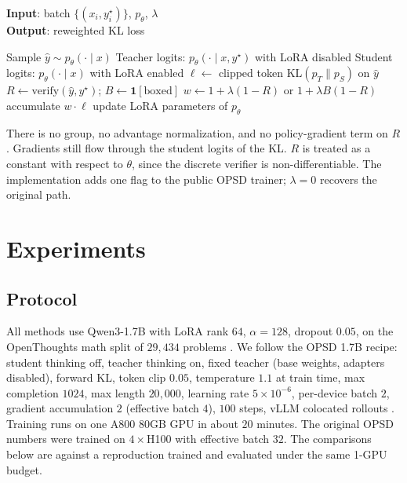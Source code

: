 \documentclass[letterpaper]{article}
\begin{document}
\begin{algorithm}[tb]
\caption{BER-OPSD training step}
\label{alg:og}
\textbf{Input}: batch $\{(x_i,y_i^\star)\}$, $p_\theta$, $\lambda$\\
\textbf{Output}: reweighted KL loss
\begin{algorithmic}[1]
\STATE Sample $\hat y\sim p_\theta(\cdot\mid x)$ 
\STATE Teacher logits: $p_\theta(\cdot\mid x,y^\star)$ with LoRA disabled
\STATE Student logits: $p_\theta(\cdot\mid x)$ with LoRA enabled
\STATE $\ell \leftarrow$ clipped token $\mathrm{KL}(p_T\|p_S)$ on $\hat y$
\STATE $R\leftarrow\mathrm{verify}(\hat y,y^\star)$;\; $B\leftarrow\mathbf{1}[\text{boxed}]$
\STATE $w\leftarrow 1+\lambda(1-R)$ or $1+\lambda B(1-R)$
\STATE accumulate $w\cdot\ell$
\ENDFOR
\STATE update LoRA parameters of $p_\theta$
\end{algorithmic}
\end{algorithm}

There is no group, no advantage normalization, and no policy-gradient term on $R$. Gradients still flow through the student logits of the KL. $R$ is treated as a constant with respect to $\theta$, since the discrete verifier is non-differentiable. The implementation adds one flag to the public OPSD trainer; $\lambda{=}0$ recovers the original path.

\section{Experiments}

\subsection{Protocol}

All methods use Qwen3-1.7B \cite{yang2025qwen3} with LoRA rank $64$, $\alpha{=}128$, dropout $0.05$, on the OpenThoughts math split of $29{,}434$ problems \cite{openthoughts2025}. We follow the OPSD 1.7B recipe: student thinking off, teacher thinking on, fixed teacher (base weights, adapters disabled), forward KL, token clip $0.05$, temperature $1.1$ at train time, max completion $1024$, max length $20{,}000$, learning rate $5{\times}10^{-6}$, per-device batch $2$, gradient accumulation $2$ (effective batch $4$), $100$ steps, vLLM colocated rollouts \cite{kwon2023vllm,hu2022lora}. Training runs on one A800 80GB GPU in about $20$ minutes. The original OPSD numbers were trained on $4{\times}$H100 with effective batch $32$. The comparisons below are against a reproduction trained and evaluated under the same 1-GPU budget.
\end{document}
